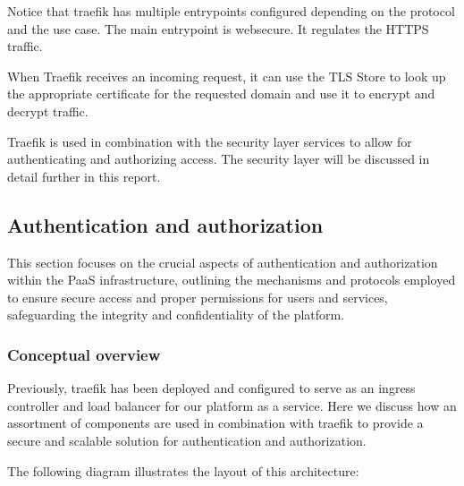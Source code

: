 \hspace{7mm}Notice that traefik has multiple entrypoints configured depending on the protocol and the use case. The main entrypoint is websecure. It regulates the HTTPS traffic.  

\hspace{7mm}When Traefik receives an incoming request, it can use the TLS Store to look up the appropriate certificate for the requested domain and use it to encrypt and decrypt traffic. 

\hspace{7mm}Traefik is used in combination with the security layer services to allow for authenticating and authorizing access. The security layer will be discussed in detail further in this report.

\subsection{Authentication and authorization}

\hspace{7mm}This section focuses on the crucial aspects of authentication and authorization within the PaaS infrastructure, outlining the mechanisms and protocols employed to ensure secure access and proper permissions for users and services, safeguarding the integrity and confidentiality of the platform.

\subsubsection{Conceptual overview }

\hspace{7mm}Previously, traefik has been deployed and configured to serve as an ingress controller and load balancer for our platform as a service. Here we discuss how an assortment of components are used in combination with traefik to provide a secure and scalable solution for authentication and authorization. 

\newpage

\hspace{7mm}The following diagram illustrates the layout of this architecture: 

